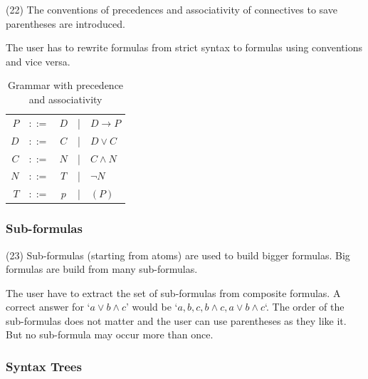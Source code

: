 (22) The conventions of precedences and associativity  of connectives to save parentheses are introduced. 

The user has to rewrite formulas from strict syntax to formulas using conventions and vice versa.

\begin{table}[htdp]
\begin{center}
\begin{tabular}{rcccl}
$P$		&$::=$ & $D$ &|& $D \rightarrow P$\\
$D$		&$::=$ & $C$ &|& $D \vee C$			\\
$C$		&$::=$ & $N$ &|& $C \wedge N$ 		\\
$N$		&$::=$ & $T$ &|& $\neg N$ 			\\
$T$		&$::=$ & $p$ &|& $(P)$
\end{tabular}
\caption{Grammar with precedence and associativity}
\label{tab:BNFGRPR}
\end{center}
\end{table}


\subsubsection{Sub-formulas}
\label{tut:23}

(23) Sub-formulas (starting from atoms) are used to build bigger formulas. Big formulas are build from many sub-formulas.

The user have to extract the set of sub-formulas from composite formulas. 
A correct answer for 
‘$a \vee b \wedge c$’ would be
‘$a,b,c,b\wedge c, a \vee b \wedge c$‘. 
The order of the sub-formulas does not matter and the user can use parentheses as they like it.
But no sub-formula may occur more than once.

\subsubsection{Syntax Trees}
\label{tut:24}

